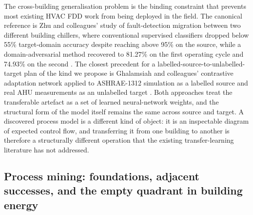 \documentclass[11pt,letterpaper]{article}
\begin{document}
The cross-building generalisation problem is the binding constraint that prevents most existing HVAC FDD work from being deployed in the field. The canonical reference is Zhu and colleagues' study of fault-detection migration between two different building chillers, where conventional supervised classifiers dropped below 55\% target-domain accuracy despite reaching above 95\% on the source, while a domain-adversarial method recovered to 81.27\% on the first operating cycle and 74.93\% on the second \cite{zhu2021chillertransfer}. The closest precedent for a labelled-source-to-unlabelled-target plan of the kind we propose is Ghalamsiah and colleagues' contrastive adaptation network applied to ASHRAE-1312 simulation as a labelled source and real AHU measurements as an unlabelled target \cite{ghalamsiah2025canhvac}. Both approaches treat the transferable artefact as a set of learned neural-network weights, and the structural form of the model itself remains the same across source and target. A discovered process model is a different kind of object: it is an inspectable diagram of expected control flow, and transferring it from one building to another is therefore a structurally different operation that the existing transfer-learning literature has not addressed.

\subsection{Process mining: foundations, adjacent successes, and the empty quadrant in building energy}
\end{document}
